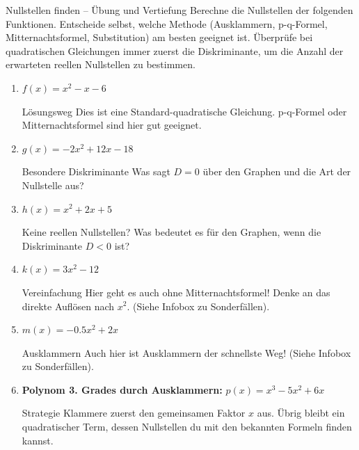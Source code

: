\begin{aufgabenumgebung}{Nullstellen finden – Übung und Vertiefung}
Berechne die Nullstellen der folgenden Funktionen. Entscheide selbst, welche Methode (Ausklammern, p-q-Formel, Mitternachtsformel, Substitution) am besten geeignet ist. Überprüfe bei quadratischen Gleichungen immer zuerst die Diskriminante, um die Anzahl der erwarteten reellen Nullstellen zu bestimmen.
\begin{enumerate}
    \item $f(x) = x^2 - x - 6$
        \begin{tippumgebung}{Lösungsweg}
        Dies ist eine Standard-quadratische Gleichung. p-q-Formel oder Mitternachtsformel sind hier gut geeignet.
        \end{tippumgebung}

    \item $g(x) = -2x^2 + 12x - 18$ 
        \begin{tippumgebung}{Besondere Diskriminante}
        Was sagt $D=0$ über den Graphen und die Art der Nullstelle aus?
        \end{tippumgebung}

    \item $h(x) = x^2 + 2x + 5$
        \begin{tippumgebung}{Keine reellen Nullstellen?}
        Was bedeutet es für den Graphen, wenn die Diskriminante $D<0$ ist?
        \end{tippumgebung}

    \item $k(x) = 3x^2 - 12$ 
        \begin{tippumgebung}{Vereinfachung}
        Hier geht es auch ohne Mitternachtsformel! Denke an das direkte Auflösen nach $x^2$. (Siehe Infobox zu Sonderfällen).
        \end{tippumgebung}

    \item $m(x) = -0.5x^2 + 2x$
        \begin{tippumgebung}{Ausklammern}
        Auch hier ist Ausklammern der schnellste Weg! (Siehe Infobox zu Sonderfällen).
        \end{tippumgebung}

    \item \textbf{Polynom 3. Grades durch Ausklammern:}
        $p(x) = x^3 - 5x^2 + 6x$
        \begin{tippumgebung}{Strategie}
        Klammere zuerst den gemeinsamen Faktor $x$ aus. Übrig bleibt ein quadratischer Term, dessen Nullstellen du mit den bekannten Formeln finden kannst.
        \end{tippumgebung}


\end{enumerate}
\end{aufgabenumgebung}
